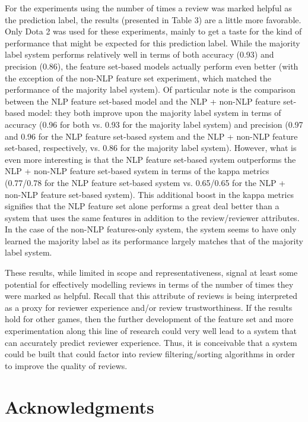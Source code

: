 \documentclass[9pt]{article}
\begin{document}
For the experiments using the number of times a review was marked helpful as the prediction label, the results (presented in Table 3) are a little more favorable. Only Dota 2 was used for these experiments, mainly to get a taste for the kind of performance that might be expected for this prediction label. While the majority label system performs relatively well in terms of both accuracy (0.93) and precision (0.86), the feature set-based models actually perform even better (with the exception of the non-NLP feature set experiment, which matched the performance of the majority label system). Of particular note is the comparison between the NLP feature set-based model and the NLP + non-NLP feature set-based model: they both improve upon the majority label system in terms of accuracy (0.96 for both vs. 0.93 for the majority label system) and precision (0.97 and 0.96 for the NLP feature set-based system and the NLP + non-NLP feature set-based, respectively, vs. 0.86 for the majority label system). However, what is even more interesting is that the NLP feature set-based system outperforms the NLP + non-NLP feature set-based system in terms of the kappa metrics (0.77/0.78 for the NLP feature set-based system vs. 0.65/0.65 for the NLP + non-NLP feature set-based system). This additional boost in the kappa metrics signifies that the NLP feature set alone performs a great deal better than a system that uses the same features in addition to the review/reviewer attributes. In the case of the non-NLP features-only system, the system seems to have only learned the majority label as its performance largely matches that of the majority label system.

These results, while limited in scope and representativeness, signal at least some potential for effectively modelling reviews in terms of the number of times they were marked as helpful. Recall that this attribute of reviews is being interpreted as a proxy for reviewer experience and/or review trustworthiness. If the results hold for other games, then the further development of the feature set and more experimentation along this line of research could very well lead to a system that can accurately predict reviewer experience. Thus, it is conceivable that a system could be built that could factor into review filtering/sorting algorithms in order to improve the quality of reviews.

\section*{Acknowledgments}
\end{document}

